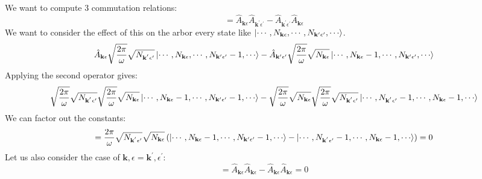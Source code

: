 \documentclass[12pt]{article}
\begin{document}
\subsection{}
We want to compute 3 commutation relations:
\begin{equation}
  [\hat{A}_{\mathbf{k} \epsilon},\hat{A}_{\mathbf{k^{\prime}} \epsilon^{\prime}}] = \hat{A}_{\mathbf{k} \epsilon}\hat{A}_{\mathbf{k^{\prime}} \epsilon^{\prime}} - \hat{A}_{\mathbf{k^{\prime}} \epsilon^{\prime}}\hat{A}_{\mathbf{k} \epsilon}
\end{equation}
We want to consider the effect of this on the arbor every state like $\ket{\cdots ,N_{\mathbf{k} \epsilon}, \cdots, N_{\mathbf{k^{\prime}} \epsilon^{\prime}}, \cdots}$.
\begin{equation}
\hat{A}_{\mathbf{k} \epsilon}\sqrt{\frac{2\pi}{\omega }} \sqrt{N_{\mathbf{k^{^{\prime}}\epsilon^{\prime}}}}\ket{\cdots ,N_{\mathbf{k} \epsilon}, \cdots, N_{\mathbf{k^{\prime}} \epsilon^{\prime}}-1, \cdots} - \hat{A}_{\mathbf{k^{\prime}} \epsilon^{\prime}}\sqrt{\frac{2\pi}{\omega }} \sqrt{N_{\mathbf{k} \epsilon}}\ket{\cdots ,N_{\mathbf{k} \epsilon}-1, \cdots, N_{\mathbf{k^{\prime}} \epsilon^{\prime}}, \cdots}
\end{equation}
Applying the second operator gives:
\begin{equation}
  \sqrt{\frac{2\pi}{\omega }} \sqrt{N_{\mathbf{k^{^{\prime}}\epsilon^{\prime}}}}\sqrt{\frac{2\pi}{\omega }} \sqrt{N_{\mathbf{k} \epsilon}}\ket{\cdots ,N_{\mathbf{k} \epsilon}-1, \cdots, N_{\mathbf{k^{\prime}} \epsilon^{\prime}}-1, \cdots} - \sqrt{\frac{2\pi}{\omega }} \sqrt{N_{\mathbf{k} \epsilon}}\sqrt{\frac{2\pi}{\omega }} \sqrt{N_{\mathbf{k^{^{\prime}}\epsilon^{\prime}}}}\ket{\cdots ,N_{\mathbf{k^{^{\prime}}\epsilon^{\prime}}}-1, \cdots, N_{\mathbf{k} \epsilon}-1, \cdots}
\end{equation}
We can factor out the constants:
\begin{equation}
  = \frac{2\pi}{\omega } \sqrt{N_{\mathbf{k^{^{\prime}}\epsilon^{\prime}}}}\sqrt{N_{\mathbf{k} \epsilon}}\left( \ket{\cdots ,N_{\mathbf{k} \epsilon}-1, \cdots, N_{\mathbf{k^{\prime}} \epsilon^{\prime}}-1, \cdots} - \ket{\cdots ,N_{\mathbf{k^{^{\prime}}\epsilon^{\prime}}}-1, \cdots, N_{\mathbf{k} \epsilon}-1, \cdots}\right) = 0
\end{equation}
Let us also consider the case of $\mathbf{k},\epsilon = \mathbf{k^{\prime}},\epsilon^{\prime}$:
\begin{equation}
  [\hat{A}_{\mathbf{k} \epsilon},\hat{A}_{\mathbf{k} \epsilon}] = \hat{A}_{\mathbf{k} \epsilon}\hat{A}_{\mathbf{k} \epsilon} - \hat{A}_{\mathbf{k} \epsilon}\hat{A}_{\mathbf{k} \epsilon} = 0
\end{equation}
\end{document}
